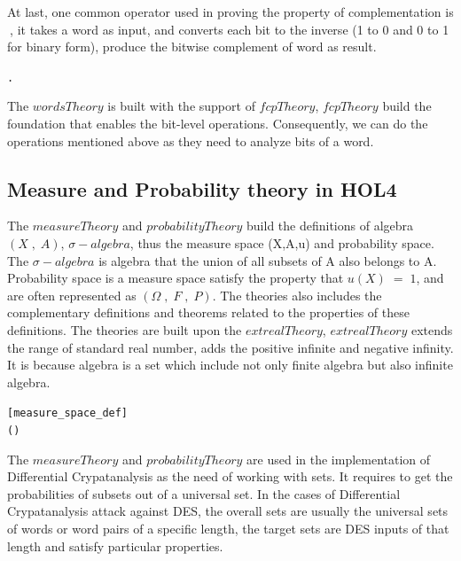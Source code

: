 \documentclass{article}
\begin{document}
At last, one common operator used in proving the property of complementation is $~$, it takes a word as input, and converts
each bit to the inverse (1 to 0 and 0 to 1 for binary form), produce the bitwise complement of word as result.

\begin{alltt}
   \HOLTokenTurnstile{} \HOLSymConst{\HOLTokenNeg{}} \HOLSymConst{=}  . \HOLSymConst{\HOLTokenNeg{}}  
\end{alltt}

The $wordsTheory$ is built with the support of $fcpTheory$, $fcpTheory$ build the foundation that enables the bit-level operations.
Consequently, we can do the operations mentioned above as they need to analyze bits of a word.

\subsection{Measure and Probability theory in HOL4}

The $measureTheory$ and $probabilityTheory$ build the definitions of algebra $(X\;,\;A)$, $\sigma-algebra$, thus the measure space (X,A,u) and probability
space. The $\sigma-algebra$ is algebra that the union of all subsets of A also belongs to A. Probability space is a measure space satisfy the
property that $u(X)\;=\;1$, and are often represented as $(\Omega\;,\; F\;,\; P)$. The theories also includes the complementary definitions and
theorems related to the properties of these definitions. The theories are built upon the $extrealTheory$, $extrealTheory$
extends the range of standard real number, adds the positive infinite and negative infinity. It is because algebra is a set which
include not only finite algebra but also infinite algebra.

\begin{alltt}
[measure_space_def]
\HOLTokenTurnstile{}   \HOLSymConst{\HOLTokenEquiv{}}
    ( ) \HOLSymConst{\HOLTokenConj{}}   \HOLSymConst{\HOLTokenConj{}}
    
\end{alltt}

The $measureTheory$ and $probabilityTheory$ are used in the implementation of Differential Crypatanalysis as the need of working with
sets. It requires to get the probabilities of subsets out of a universal set. In the cases of Differential Crypatanalysis attack against
DES, the overall sets are usually the universal sets of words or word pairs of a specific length, the target sets are DES
inputs of that length and satisfy particular properties.
\end{document}
